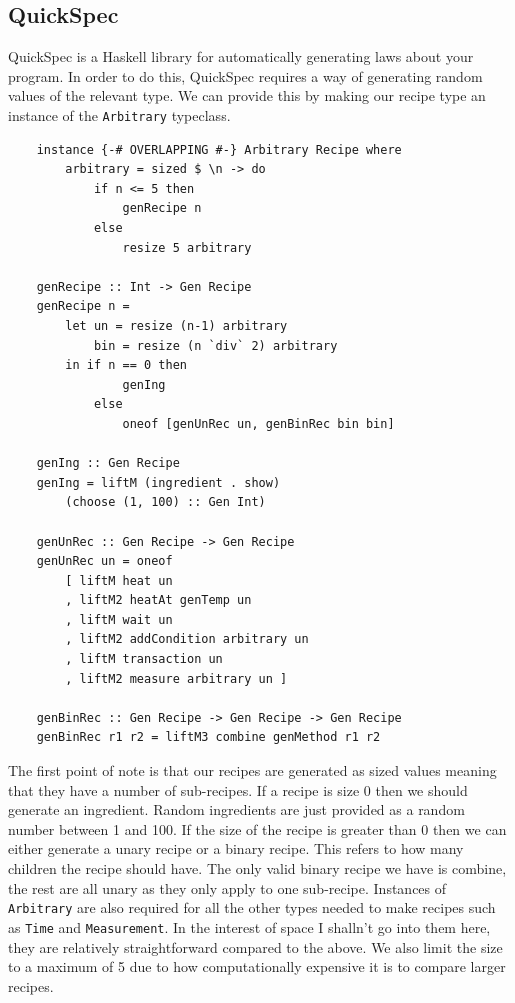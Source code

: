\documentclass[11pt]{article}
\begin{document}
\subsection{QuickSpec}

QuickSpec \cite{quickspec, quickspec2} is a Haskell library for automatically generating
laws about your program. In order to do this, QuickSpec requires a way of generating
random values of the relevant type. We can provide this by making our recipe type
an instance of the \texttt{Arbitrary} typeclass.

\begin{lstlisting}
    instance {-# OVERLAPPING #-} Arbitrary Recipe where
        arbitrary = sized $ \n -> do
            if n <= 5 then
                genRecipe n
            else
                resize 5 arbitrary

    genRecipe :: Int -> Gen Recipe
    genRecipe n =
        let un = resize (n-1) arbitrary
            bin = resize (n `div` 2) arbitrary
        in if n == 0 then
                genIng
            else
                oneof [genUnRec un, genBinRec bin bin]

    genIng :: Gen Recipe
    genIng = liftM (ingredient . show)
        (choose (1, 100) :: Gen Int)

    genUnRec :: Gen Recipe -> Gen Recipe
    genUnRec un = oneof
        [ liftM heat un
        , liftM2 heatAt genTemp un
        , liftM wait un
        , liftM2 addCondition arbitrary un
        , liftM transaction un
        , liftM2 measure arbitrary un ]

    genBinRec :: Gen Recipe -> Gen Recipe -> Gen Recipe
    genBinRec r1 r2 = liftM3 combine genMethod r1 r2
\end{lstlisting}

The first point of note is that our recipes are generated as sized values meaning
that they have a number of sub-recipes. If a recipe is size 0 then we should generate
an ingredient. Random ingredients are just provided as a random number between 1 and 100.
If the size of the recipe is greater than 0 then we can either generate a unary recipe
or a binary recipe. This refers to how many children the recipe should have. The only
valid binary recipe we have is combine, the rest are all unary as they only apply to
one sub-recipe. Instances of \texttt{Arbitrary} are also required for all the other types
needed to make recipes such as \texttt{Time} and \texttt{Measurement}. In the interest
of space I shalln't go into them here, they are relatively straightforward compared to
the above. We also limit the size to a maximum of 5 due to how computationally expensive
it is to compare larger recipes.
\end{document}

